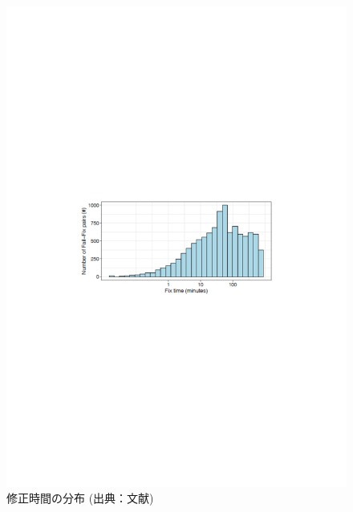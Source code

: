 \begin{figure}[t]
    \centering
    \includegraphics[width=0.9\linewidth, angle=0]{./thesis3/docker-build-failuer-number3.pdf}
    \caption{修正時間の分布 (出典：文献\cite{docker-failures})}
    \label{fig:3_docker-build-failuer-number}
\end{figure}

